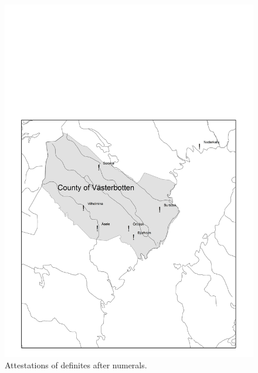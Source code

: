 \begin{figure}[h]
\includegraphics[height=.3\textheight]{figures/16_AttestationsofDefinitesNumerals}
\caption{Attestations of definites after numerals.}
\label{map:13}

\end{figure}

